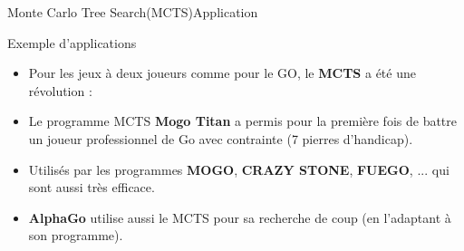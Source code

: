 \begin{frame}{Monte Carlo Tree Search(MCTS)}{Application}
	\begin{block}{Exemple d'applications}
		\begin{itemize}
			\item Pour les jeux à deux joueurs comme pour le GO, le \textbf{MCTS} a été une révolution :
			\item Le programme MCTS \textbf{Mogo Titan} a permis pour la première fois de battre un joueur professionnel de Go avec contrainte (7 pierres d'handicap).
			\item Utilisés par les programmes \textbf{MOGO}, \textbf{CRAZY STONE}, \textbf{FUEGO}, ... qui sont aussi très efficace.
			\item \textbf{AlphaGo} utilise aussi le MCTS pour sa recherche de coup (en l'adaptant à son programme).
			
		\end{itemize}
	\end{block}
\end{frame}